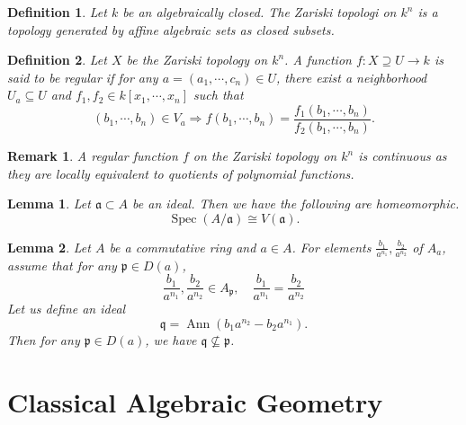 \documentclass{article}
\newtheorem{definition}{Definition}[section]
\newtheorem{lemma}{Lemma}[section]
\newtheorem{remark}{Remark}[section]
\numberwithin{equation}{section}
\DeclareMathOperator{\Ann}{Ann}
\DeclareMathOperator{\Spec}{Spec}
\begin{document}
\begin{definition}
Let $k$ be an algebraically closed. The Zariski topologi on $k^n$ is a topology generated by affine algebraic sets as closed subsets. 
\end{definition}

\begin{definition}
Let $X$ be the Zariski topology on $k^n$. A function $f:X\supseteq U\to k$ is said to be regular if for any $a=(a_1,\cdots,c_n)\in U$, there exist a neighborhood $U_a\subseteq U$ and $f_1,f_2\in k[x_1,\cdots,x_n]$ such that 
\begin{equation*}
(b_1,\cdots,b_n)\in V_a \Rightarrow f(b_1,\cdots,b_n) = {\frac {f_1(b_1,\cdots,b_n)} {f_2(b_1,\cdots,b_n)}}.
\end{equation*}
\end{definition}

\begin{remark}
A regular function $f$ on the Zariski topology on $k^n$ is continuous as they are locally equivalent to quotients of polynomial functions.
\label{reg_cont_inc}
\end{remark}

\begin{lemma}
Let $\mathfrak{a}\subset A$ be an ideal. Then we have the following are homeomorphic.
\begin{equation*}
\Spec(A/\mathfrak{a}) \cong V(\mathfrak{a}).
\end{equation*}
\end{lemma}

\begin{lemma}
Let $A$ be a commutative ring and $a\in A$. For elements ${\frac {b_1} {a^{n_1}}},{\frac {b_2} {a^{n_2}}}$ of $A_a$, assume that for any $\mathfrak{p}\in D(a)$, 
\begin{equation*}
{\frac {b_1} {a^{n_1}}},{\frac {b_2} {a^{n_2}}}\in A_{\mathfrak{p}}, \quad {\frac {b_1} {a^{n_1}}}={\frac {b_2} {a^{n_2}}}
\end{equation*}
Let us define an ideal
\begin{equation*}
\mathfrak{q} = \Ann(b_1a^{n_2}-b_2a^{n_1}).
\end{equation*}
Then for any $\mathfrak{p}\in D(a)$, we have $\mathfrak{q}\not\subseteq \mathfrak{p}$.
\end{lemma}

\section{Classical Algebraic Geometry}
\end{document}
